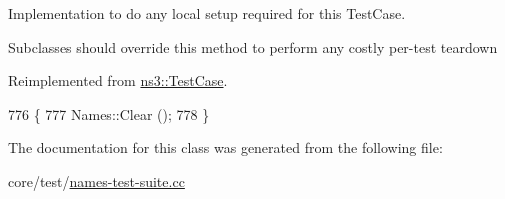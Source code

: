 Implementation to do any local setup required for this Test\+Case. 

Subclasses should override this method to perform any costly per-\/test teardown 

Reimplemented from \hyperlink{classns3_1_1TestCase_a8917f1604e28d312a8086f76291e3c46}{ns3\+::\+Test\+Case}.


\begin{DoxyCode}
776 \{
777   Names::Clear ();
778 \}
\end{DoxyCode}


The documentation for this class was generated from the following file\+:\begin{DoxyCompactItemize}
\item 
core/test/\hyperlink{names-test-suite_8cc}{names-\/test-\/suite.\+cc}\end{DoxyCompactItemize}
